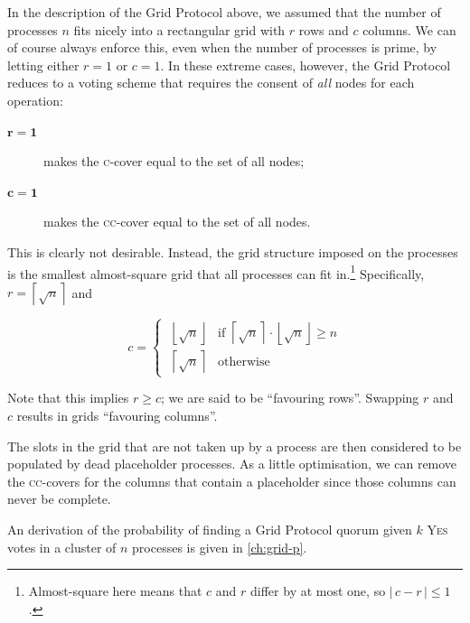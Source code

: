\documentclass[12pt,chapterprefix=true,toc=bibliography,numbers=noendperiod,
               footnotes=multiple,twoside]{scrreprt}
\newcommand{\yes}{{\fontfamily{jkposn}\selectfont\textsc{Yes}}}
\begin{document}

In the description of the Grid Protocol above, we assumed that the number of processes \(n\) fits nicely into a rectangular grid with \(r\) rows and \(c\) columns. We can of course always enforce this, even when the number of processes is prime, by letting either \(r = 1\) or \(c = 1\). In these extreme cases, however, the Grid Protocol reduces to a voting scheme that requires the consent of \emph{all} nodes for each operation:

\begin{description}
    \item[\(\mathbf{r = 1}\)] makes the \textsc{c}-cover equal to the set of all nodes;
    \item[\(\mathbf{c = 1}\)] makes the \textsc{cc}-cover equal to the set of all nodes.
\end{description}

This is clearly not desirable. Instead, the grid structure imposed on the processes is the smallest almost-square grid that all processes can fit in.\footnote{Almost-square here means that \(c\) and \(r\) differ by at most one, so \(|\,c - r\,| \leq 1\).} Specifically, \( r = \left\lceil \sqrt{n} \right\rceil \) and

\begin{equation}
    c =
    \begin{cases}
        \;\left\lfloor \sqrt{n} \right\rfloor
                 & \text{if } \left\lceil \sqrt{n} \right\rceil
                        \cdot \left\lfloor \sqrt{n} \right\rfloor \geq n \\[0.5em]
        \;\left\lceil \sqrt{n} \right\rceil & \text{otherwise}
    \end{cases}
    \label{eq:grid-dims}
\end{equation}

Note that this implies \(r \geq c\); we are said to be \enquote{favouring rows}. Swapping \(r\) and \(c\) results in grids \enquote{favouring columns}.

The slots in the grid that are not taken up by a process are then considered to be populated by dead placeholder processes. As a little optimisation, we can remove the \textsc{cc}-covers for the columns that contain a placeholder since those columns can never be complete.

An derivation of the probability of finding a Grid Protocol quorum given \(k\) \yes{} votes in a cluster of \(n\) processes is given in \cref{ch:grid-p}.
\end{document}
